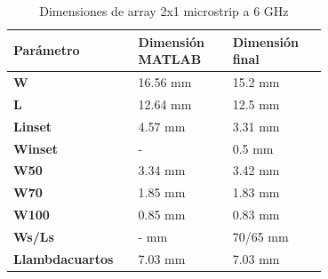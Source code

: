 \begin{table}[H]
  
   \label{tab:array2x22}
   \small %
   \centering %
   \begin{tabular}{m{0.2\linewidth}m{0.25\linewidth}m{0.25\linewidth}} %
   \toprule[\heavyrulewidth]\toprule[\heavyrulewidth]
   \textbf{Parámetro} & \textbf{Dimensión MATLAB} & \textbf{Dimensión final} \\ 
   \midrule
   \textbf{W} & 16.56 mm & 15.2 mm \\
   \textbf{L} & 12.64 mm & 12.5 mm\\
   \textbf{Linset} & 4.57 mm & 3.31 mm\\
   \textbf{Winset} & - & 0.5 mm\\
   \textbf{W50} & 3.34 mm & 3.42 mm\\
   \textbf{W70} & 1.85 mm & 1.83 mm\\
   \textbf{W100} & 0.85 mm & 0.83 mm\\
   \textbf{Ws/Ls} & - mm & 70/65 mm\\
   \textbf{Llambdacuartos} & 7.03 mm & 7.03 mm\\
   \bottomrule[\heavyrulewidth] 
   \end{tabular}
   \caption{Dimensiones de array 2x1 microstrip a 6 GHz} 
\end{table}





